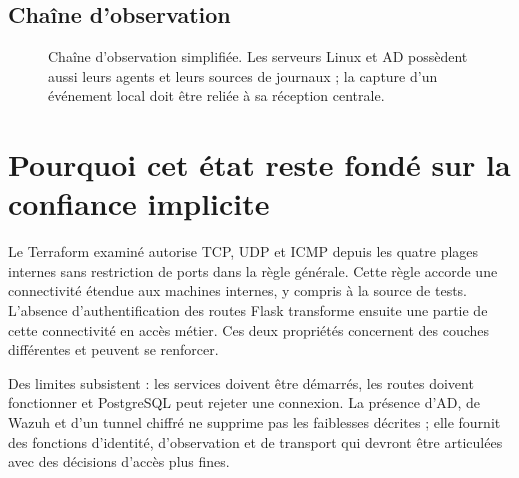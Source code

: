 \documentclass[a4paper,12pt]{report}
\begin{document}
\subsection{Chaîne d'observation}
\begin{figure}[H]\centering
{}
\caption[Chaîne d'observation Sysmon et Wazuh]{Chaîne d'observation simplifiée. Les serveurs Linux et AD possèdent aussi leurs agents et leurs sources de journaux ; la capture d'un événement local doit être reliée à sa réception centrale.}
\end{figure}

\section{Pourquoi cet état reste fondé sur la confiance implicite}
Le Terraform examiné autorise TCP, UDP et ICMP depuis les quatre plages internes sans restriction de ports dans la règle générale. Cette règle accorde une connectivité étendue aux machines internes, y compris à la source de tests. L'absence d'authentification des routes Flask transforme ensuite une partie de cette connectivité en accès métier. Ces deux propriétés concernent des couches différentes et peuvent se renforcer.

Des limites subsistent : les services doivent être démarrés, les routes doivent fonctionner et PostgreSQL peut rejeter une connexion. La présence d'AD, de Wazuh et d'un tunnel chiffré ne supprime pas les faiblesses décrites ; elle fournit des fonctions d'identité, d'observation et de transport qui devront être articulées avec des décisions d'accès plus fines.
\end{document}
